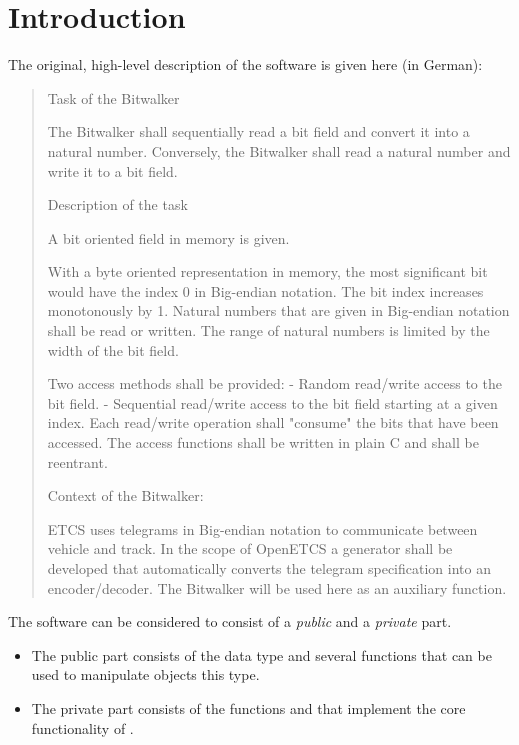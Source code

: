 
\section{Introduction}
\label{sec:introduction}

The original, high-level description of the \bitwalker software is given here (in German):

\begin{quote}
 
Task of the Bitwalker
 
The Bitwalker shall sequentially read a bit field and convert it into a natural number.
Conversely, the Bitwalker shall read a natural number and write it to a bit field.
 
Description of the task
 
A bit oriented field in memory is given.

With a byte oriented representation in memory, the most significant bit
would have the index 0 in Big-endian notation.
The bit index increases monotonously by 1.
Natural numbers that are given in Big-endian notation shall be read or written.
The range of natural numbers is limited by the width of the bit field.

Two access methods shall be provided:
- Random read/write access to the bit field. 
- Sequential read/write access to the bit field starting at a given index.
Each read/write operation shall "consume" the bits that have been accessed.
The access functions shall be written in plain C and shall be reentrant.
 
Context of the Bitwalker:
 
ETCS uses telegrams in Big-endian notation to communicate between vehicle and track.
In the scope of OpenETCS a generator shall be developed that
automatically converts the telegram specification into an encoder/decoder.
The Bitwalker will be used here as an auxiliary function.
\end{quote}






The \bitwalker software can be considered to consist of a \emph{public}
and a \emph{private} part.
\begin{itemize}
\item
The public part consists of the \isoc data type \bitwalkertype and several \isoc functions
that can be used to manipulate objects this type.

\item
The private part consists of the functions \peek and \poke
that implement the core functionality of \bitwalker.
\end{itemize}

